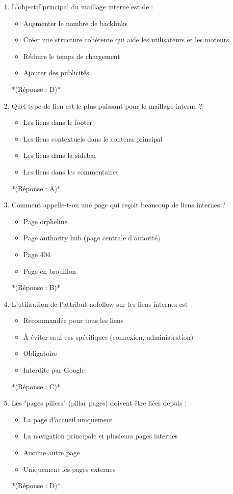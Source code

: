 \documentclass[12pt,a4paper,twoside]{report}
\begin{document}
\begin{enumerate}
\item L'objectif principal du maillage interne est de :
\begin{itemize}
\item[A)] Augmenter le nombre de backlinks
\item[B)] Créer une structure cohérente qui aide les utilisateurs et les moteurs
\item[C)] Réduire le temps de chargement
\item[D)] Ajouter des publicités
\end{itemize}
*(Réponse : D)*

\item Quel type de lien est le plus puissant pour le maillage interne ?
\begin{itemize}
\item[A)] Les liens dans le footer
\item[B)] Les liens contextuels dans le contenu principal
\item[C)] Les liens dans la sidebar
\item[D)] Les liens dans les commentaires
\end{itemize}
*(Réponse : A)*

\item Comment appelle-t-on une page qui reçoit beaucoup de liens internes ?
\begin{itemize}
\item[A)] Page orpheline
\item[B)] Page authority hub (page centrale d'autorité)
\item[C)] Page 404
\item[D)] Page en brouillon
\end{itemize}
*(Réponse : B)*

\item L'utilisation de l'attribut nofollow sur les liens internes est :
\begin{itemize}
\item[A)] Recommandée pour tous les liens
\item[B)] À éviter sauf cas spécifiques (connexion, administration)
\item[C)] Obligatoire
\item[D)] Interdite par Google
\end{itemize}
*(Réponse : C)*

\item Les "pages piliers" (pillar pages) doivent être liées depuis :
\begin{itemize}
\item[A)] La page d'accueil uniquement
\item[B)] La navigation principale et plusieurs pages internes
\item[C)] Aucune autre page
\item[D)] Uniquement les pages externes
\end{itemize}
*(Réponse : D)*


\end{enumerate}
\end{document}
